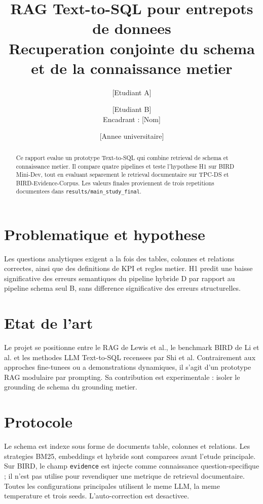 \documentclass[11pt,a4paper]{article}
\title{RAG Text-to-SQL pour entrepots de donnees\\
\large Recuperation conjointe du schema et de la connaissance metier}
\author{[Etudiant A] \and [Etudiant B]\\ Encadrant : [Nom]}
\date{[Annee universitaire]}
\begin{document}
\maketitle

\begin{abstract}
Ce rapport evalue un prototype Text-to-SQL qui combine retrieval de schema et
connaissance metier. Il compare quatre pipelines et teste l'hypothese H1 sur
BIRD Mini-Dev, tout en evaluant separement le retrieval documentaire sur
TPC-DS et BIRD-Evidence-Corpus. Les valeurs finales proviennent de trois
repetitions documentees dans \texttt{results/main\_study\_final}.
\end{abstract}

\section{Problematique et hypothese}
Les questions analytiques exigent a la fois des tables, colonnes et relations
correctes, ainsi que des definitions de KPI et regles metier. H1 predit une
baisse significative des erreurs semantiques du pipeline hybride D par rapport
au pipeline schema seul B, sans difference significative des erreurs
structurelles.

\section{Etat de l'art}
Le projet se positionne entre le RAG de Lewis et al., le benchmark BIRD de Li
et al. et les methodes LLM Text-to-SQL recensees par Shi et al. Contrairement
aux approches fine-tunees ou a demonstrations dynamiques, il s'agit d'un
prototype RAG modulaire par prompting. Sa contribution est experimentale :
isoler le grounding de schema du grounding metier.

\section{Protocole}
Le schema est indexe sous forme de documents table, colonnes et relations. Les
strategies BM25, embeddings et hybride sont comparees avant l'etude principale.
Sur BIRD, le champ \texttt{evidence} est injecte comme connaissance
question-specifique ; il n'est pas utilise pour revendiquer une metrique de
retrieval documentaire. Toutes les configurations principales utilisent le meme
LLM, la meme temperature et trois seeds. L'auto-correction est desactivee.
\end{document}
